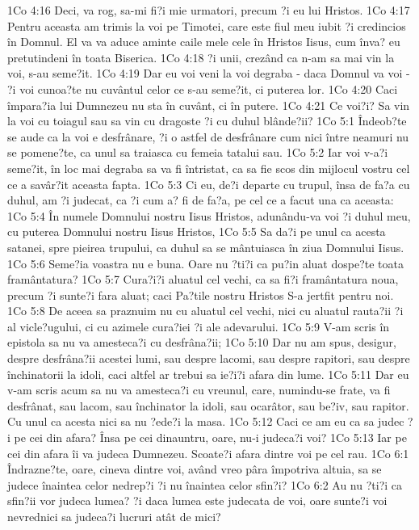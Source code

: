 1Co 4:16  Deci, va rog, sa-mi fi?i mie urmatori, precum ?i eu lui Hristos.
1Co 4:17  Pentru aceasta am trimis la voi pe Timotei, care este fiul meu iubit ?i credincios în Domnul. El va va aduce aminte caile mele cele în Hristos Iisus, cum înva? eu pretutindeni în toata Biserica.
1Co 4:18  ?i unii, crezând ca n-am sa mai vin la voi, s-au seme?it.
1Co 4:19  Dar eu voi veni la voi degraba - daca Domnul va voi - ?i voi cunoa?te nu cuvântul celor ce s-au seme?it, ci puterea lor.
1Co 4:20  Caci împara?ia lui Dumnezeu nu sta în cuvânt, ci în putere.
1Co 4:21  Ce voi?i? Sa vin la voi cu toiagul sau sa vin cu dragoste ?i cu duhul blânde?ii?
1Co 5:1  Îndeob?te se aude ca la voi e desfrânare, ?i o astfel de desfrânare cum nici între neamuri nu se pomene?te, ca unul sa traiasca cu femeia tatalui sau.
1Co 5:2  Iar voi v-a?i seme?it, în loc mai degraba sa va fi întristat, ca sa fie scos din mijlocul vostru cel ce a savâr?it aceasta fapta.
1Co 5:3  Ci eu, de?i departe cu trupul, însa de fa?a cu duhul, am ?i judecat, ca ?i cum a? fi de fa?a, pe cel ce a facut una ca aceasta:
1Co 5:4  În numele Domnului nostru Iisus Hristos, adunându-va voi ?i duhul meu, cu puterea Domnului nostru Iisus Hristos,
1Co 5:5  Sa da?i pe unul ca acesta satanei, spre pieirea trupului, ca duhul sa se mântuiasca în ziua Domnului Iisus.
1Co 5:6  Seme?ia voastra nu e buna. Oare nu ?ti?i ca pu?in aluat dospe?te toata framântatura?
1Co 5:7  Cura?i?i aluatul cel vechi, ca sa fi?i framântatura noua, precum ?i sunte?i fara aluat; caci Pa?tile nostru Hristos S-a jertfit pentru noi.
1Co 5:8  De aceea sa praznuim nu cu aluatul cel vechi, nici cu aluatul rauta?ii ?i al vicle?ugului, ci cu azimele cura?iei ?i ale adevarului.
1Co 5:9  V-am scris în epistola sa nu va amesteca?i cu desfrâna?ii;
1Co 5:10  Dar nu am spus, desigur, despre desfrâna?ii acestei lumi, sau despre lacomi, sau despre rapitori, sau despre închinatorii la idoli, caci altfel ar trebui sa ie?i?i afara din lume.
1Co 5:11  Dar eu v-am scris acum sa nu va amesteca?i cu vreunul, care, numindu-se frate, va fi desfrânat, sau lacom, sau închinator la idoli, sau ocarâtor, sau be?iv, sau rapitor. Cu unul ca acesta nici sa nu ?ede?i la masa.
1Co 5:12  Caci ce am eu ca sa judec ?i pe cei din afara? Însa pe cei dinauntru, oare, nu-i judeca?i voi?
1Co 5:13  Iar pe cei din afara îi va judeca Dumnezeu. Scoate?i afara dintre voi pe cel rau.
1Co 6:1  Îndrazne?te, oare, cineva dintre voi, având vreo pâra împotriva altuia, sa se judece înaintea celor nedrep?i ?i nu înaintea celor sfin?i?
1Co 6:2  Au nu ?ti?i ca sfin?ii vor judeca lumea? ?i daca lumea este judecata de voi, oare sunte?i voi nevrednici sa judeca?i lucruri atât de mici?
